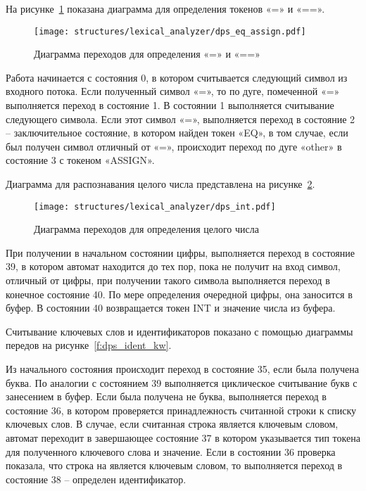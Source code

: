 На рисунке~\ref{f:dps_eq_assign} показана диаграмма для определения токенов «=» и «==».

\begin{figure}[ht]
	\centering
	\vspace{\toppaddingoffigure}
	\texttt{[image: structures/lexical\_analyzer/dps\_eq\_assign.pdf]}
	\caption{Диаграмма переходов для определения «=» и «==»}
	\label{f:dps_eq_assign}
\end{figure}

Работа начинается с состояния 0, в котором считывается следующий символ из входного потока.
Если полученный символ «=», то по дуге, помеченной «=» выполняется переход в состояние 1.
В состоянии 1 выполняется считывание следующего символа.
Если этот символ «=», выполняется переход в состояние 2 – заключительное состояние,
в котором найден токен «EQ», в том случае, если был получен символ отличный от «=»,
происходит переход по дуге «other» в состояние 3 с токеном «ASSIGN».

Диаграмма для распознавания целого числа представлена на рисунке~\ref{f:dps_int}.

\begin{figure}[ht]
	\centering
	\vspace{\toppaddingoffigure}
	\texttt{[image: structures/lexical\_analyzer/dps\_int.pdf]}
	\caption{Диаграмма переходов для определения целого числа}
	\label{f:dps_int}
\end{figure}

При получении в начальном состоянии цифры, выполняется переход в состояние 39, в котором автомат находится до тех пор,
пока не получит на вход символ, отличный от цифры, при получении такого символа выполняется переход в конечное состояние 40.
По мере определения очередной цифры, она заносится в буфер.
В состоянии 40 возвращается токен INT и значение числа из буфера.

Считывание ключевых слов и идентификаторов показано с помощью диаграммы передов на рисунке~\ref{f:dps_ident_kw}.

Из начального состояния происходит переход в состояние 35, если была получена буква.
По аналогии с состоянием 39 выполняется циклическое считывание букв с занесением в буфер.
Если была получена не буква, выполняется переход в состояние 36, в котором проверяется принадлежность считанной строки к списку ключевых слов.
В случае, если считанная строка является ключевым словом, автомат переходит в завершающее состояние 37 в котором указывается тип токена для полученного ключевого слова и значение.
Если в состоянии 36 проверка показала, что строка на является ключевым словом, то выполняется переход в состояние 38 – определен идентификатор.

